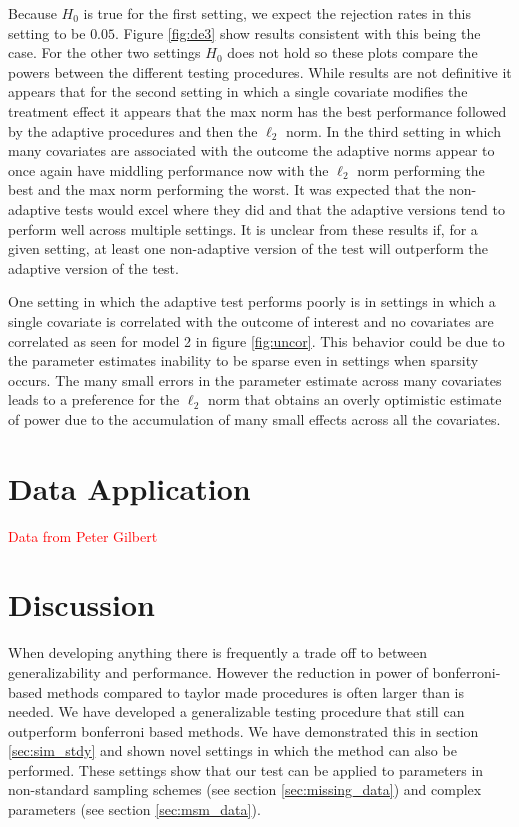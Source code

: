 \documentclass{article}
\newcommand{\sh}{\textcolor{red}}
\begin{document}
Because $H_0$ is true for the first setting, we expect the rejection rates in this setting to be $0.05$.  Figure \ref{fig:de3} show results consistent with this being the case. For the other two settings $H_0$ does not hold so these plots compare the powers between the different testing procedures. While results are not definitive it appears that for the second setting in which a single covariate modifies the treatment effect it appears that the max norm has the best performance followed by the adaptive procedures and then the $\ell_2$ norm. In the third setting in which many covariates are associated with the outcome the adaptive norms appear to once again have middling performance now with the $\ell_2$ norm performing the best and the max norm performing the worst. It was expected that the non-adaptive tests would excel where they did and that the adaptive versions tend to perform well across multiple settings.  It is unclear from these results if, for a given setting, at least one non-adaptive version of the test will outperform the adaptive version of the test.

One setting in which the adaptive test performs poorly is in settings in which a single covariate is correlated with the outcome of interest and no covariates are correlated as seen for model 2 in figure \ref{fig:uncor}. This behavior could be due to the parameter estimates inability to be sparse even in settings when sparsity occurs.  The many small errors in the parameter estimate across many covariates leads to a preference for the $\ell_2$ norm that obtains an overly optimistic estimate of power due to the accumulation of many small effects across all the covariates.


\section{Data Application}
\label{sec:data_app}
\sh{Data from Peter Gilbert}

\section{Discussion}
\label{sec:discuss}
When developing anything there is frequently a trade off to between generalizability and performance. However the reduction in power of bonferroni-based methods compared to taylor made procedures is often larger than is needed.  We have developed a generalizable testing procedure that still can outperform bonferroni based methods.  We have demonstrated this in section \ref{sec:sim_stdy} and shown novel settings in which the method can also be performed.  These settings show that our test can be applied to parameters in non-standard sampling schemes (see section \ref{sec:missing_data}) and complex parameters (see section \ref{sec:msm_data}).  
\end{document}
